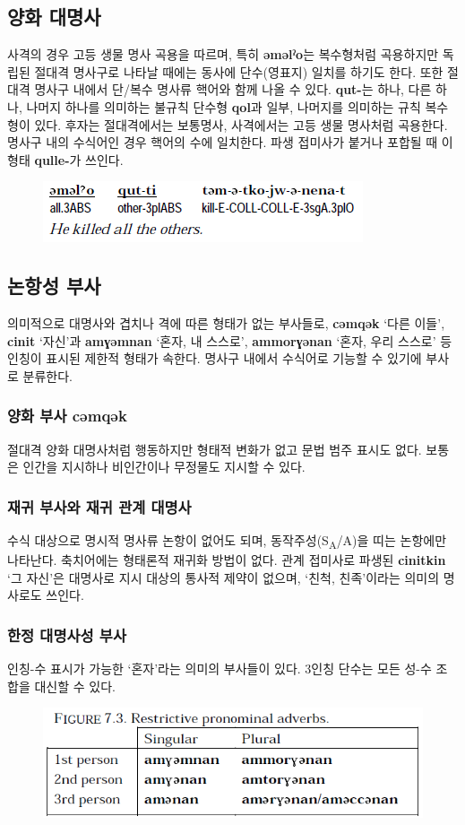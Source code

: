 \subsection{양화 대명사}
사격의 경우 고등 생물 명사 곡용을 따르며, 특히 \textbf{əməlˀo}는 복수형처럼 곡용하지만 독립된 절대격 명사구로 나타날 때에는 동사에 단수(영표지) 일치를 하기도 한다. 또한 절대격 명사구 내에서 단/복수 명사류 핵어와 함께 나올 수 있다. \textbf{qut-}는 하나, 다른 하나, 나머지 하나를 의미하는 불규칙 단수형 \textbf{qol}과 일부, 나머지를 의미하는 규칙 복수형이 있다. 후자는 절대격에서는 보통명사, 사격에서는 고등 생물 명사처럼 곡용한다. 명사구 내의 수식어인 경우 핵어의 수에 일치한다. 파생 접미사가 붙거나 포합될 때 이형태 \textbf{qulle-}가 쓰인다.
\begin{figure}[H]
\centerline{\includegraphics{Chukchi/src/chqu.png}}
\end{figure}
\subsection{논항성 부사}
의미적으로 대명사와 겹치나 격에 따른 형태가 없는 부사들로, \textbf{cəmqək} `다른 이들', \textbf{cinit} `자신'과 \textbf{amɣəmnan} `혼자, 내 스스로', \textbf{ammorɣənan} `혼자, 우리 스스로' 등 인칭이 표시된 제한적 형태가 속한다. 명사구 내에서 수식어로 기능할 수 있기에 부사로 분류한다. 
\subsubsection{양화 부사 cəmqək}
절대격 양화 대명사처럼 행동하지만 형태적 변화가 없고 문법 범주 표시도 없다. 보통은 인간을 지시하나 비인간이나 무정물도 지시할 수 있다.
\subsubsection{재귀 부사와 재귀 관계 대명사}
수식 대상으로 명시적 명사류 논항이 없어도 되며, 동작주성(S\textsubscript{A}/A)을 띠는 논항에만 나타난다. 축치어에는 형태론적 재귀화 방법이 없다. 관계 접미사로 파생된 \textbf{cinitkin} `그 자신'은 대명사로 지시 대상의 통사적 제약이 없으며, `친척, 친족'이라는 의미의 명사로도 쓰인다.
\subsubsection{한정 대명사성 부사}
인칭-수 표시가 가능한 `혼자'라는 의미의 부사들이 있다. 3인칭 단수는 모든 성-수 조합을 대신할 수 있다.
\begin{figure}[H]
\centerline{\includegraphics{Chukchi/src/chad.png}}
\end{figure}

